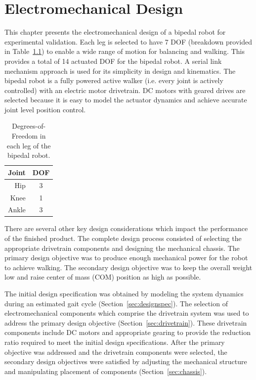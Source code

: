 \chapter{Electromechanical Design} %
\label{cha:design}

This chapter presents the electromechanical design of a bipedal robot for experimental validation. Each leg is selected to have 7 DOF (breakdown provided in Table~\ref{tab:doftable}) to enable a wide range of motion for balancing and walking. This provides a total of 14 actuated DOF for the bipedal robot. A serial link mechanism approach is used for its simplicity in design and kinematics. The bipedal robot is a fully powered active walker (i.e. every joint is actively controlled) with an electric motor drivetrain. DC motors with geared drives are selected because it is easy to model the actuator dynamics and achieve accurate joint level position control. 

\begin{table}[h]
  \centering
  \caption{Degrees-of-Freedom in each leg of the bipedal robot.}
    \begin{tabular}{rc}
    \addlinespace
    \toprule
    \textbf{Joint} & \textbf{DOF} \\
    \midrule
    Hip   & 3 \\
    Knee  & 1 \\
    Ankle & 3 \\
    \bottomrule
    \end{tabular}
  \label{tab:doftable}
\end{table}

There are several other key design considerations which impact the performance of the finished product. The complete design process consisted of selecting the appropriate drivetrain components and designing the mechanical chassis. The primary design objective was to produce enough mechanical power for the robot to achieve walking. The secondary design objective was to keep the overall weight low and raise center of mass (COM) position as high as possible. 

The initial design specification was obtained by modeling the system dynamics during an estimated gait cycle (Section~\ref{sec:designspec}). The selection of electromechanical components which comprise the drivetrain system was used to address the primary design objective (Section~\ref{sec:drivetrain}). These drivetrain components include DC motors and appropriate gearing to provide the reduction ratio required to meet the initial design specifications. After the primary objective was addressed and the drivetrain components were selected, the secondary design objectives were satisfied by adjusting the mechanical structure and manipulating placement of components (Section~\ref{sec:chassis}).

